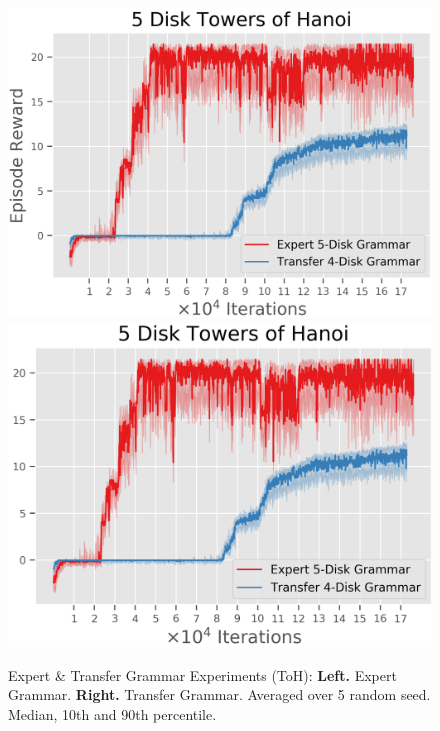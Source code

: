 \documentclass[10pt,letterpaper]{article}
\begin{document}
\begin{figure}[H]
  \includegraphics[width=\linewidth]{figures/hanoi_5_learning_curve}
\endminipage\hfill
{}
  \includegraphics[width=\linewidth]{figures/hanoi_6_learning_curve}
\endminipage\hfill
\caption{Expert \& Transfer Grammar Experiments (ToH): \textbf{Left.} Expert Grammar. \textbf{Right.} Transfer Grammar. Averaged over 5 random seed. Median, 10th and 90th percentile.}
\label{fig:expert_grammar_toh}
\end{figure}
\end{document}
